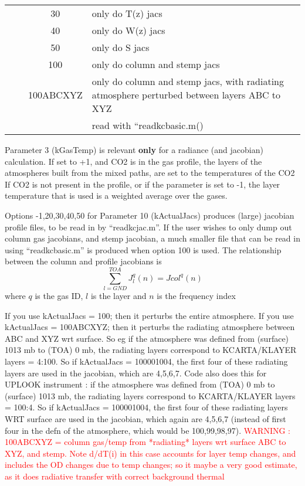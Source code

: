 \documentclass[12pt]{article}
\newlength{\colwidth}
\newlength{\colwidthshort}
\begin{document}
\begin{small}
\begin{longtable}{|c|c|c|p{\colwidthshort}|}
  &              & {30}        & only do T(z) jacs\\
  &              & {40}        & only do W(z) jacs\\
  &              & {50}        & only do S jacs\\   
  &              & {100}       & only do column and stemp jacs\\
  &              & {100ABCXYZ} & only do column and stemp jacs, with 
                   radiating atmosphere perturbed between layers ABC to XYZ\\
  &              &             &  read with ``readkcbasic.m()\\   \hline
  \hline
\end{longtable}
\end{small}

Parameter 3 ({\sf kGasTemp}) is relevant {\bf only} for a radiance
(and jacobian) calculation.  If set to +1, and CO2 is in the gas
profile, the layers of the atmospheres built from the mixed paths, are
set to the temperatures of the CO2 If CO2 is not present in the
profile, or if the parameter is set to -1, the layer temperature that
is used is a weighted average over the gases.

Options -1,20,30,40,50 for Parameter 10 ({\sf kActualJacs}) produces (large) 
jacobian profile files, to be read in by ``readkcjac.m''. If the user wishes 
to only dump out column gas jacobians, and stemp jacobian, a much smaller 
file that can be read in using ``readkcbasic.m'' is produced when option 100
is used. The relationship between the column and profile jacobians is
\[
\displaystyle\sum_{l=GND}^{TOA} J^{q}_{l}(n) = Jcol^{q}(n)
\]
where $q$ is the  gas ID, $l$ is the layer and $n$ is the frequency index

If you use {\sf kActualJacs} = 100; then it perturbs the entire atmosphere.
If you use {\sf kActualJacs} = 100ABCXYZ; then it perturbs the radiating 
atmosphere between ABC and XYZ wrt surface. So eg if the atmosphere was 
defined from 
(surface) 1013 mb to (TOA) 0 mb, the radiating layers correspond to 
KCARTA/KLAYER layers = 4:100. So if {\sf kActualJacs} = 100001004, the first 
four of these radiating layers are used in the jacobian, which are 4,5,6,7.
Code also does this for UPLOOK instrument : if the atmosphere was defined from 
(TOA) 0 mb to (surface) 1013 mb, the radiating layers correspond to 
KCARTA/KLAYER layers = 100:4. So if {\sf kActualJacs} = 100001004, the first 
four of these radiating layers WRT surface are used in the jacobian, 
which again are 4,5,6,7 (instead of first four in the defn of the atmosphere, 
which would be 100,99,98,97).
\textcolor{red}{WARNING : 100ABCXYZ = column gas/temp from *radiating* layers 
wrt surface ABC to XYZ, and stemp. Note d/dT(i) in this case accounts for 
layer temp changes, and includes the OD changes due to temp changes; 
so it maybe a very good estimate, as it does radiative transfer
with correct background thermal}
\end{document}
